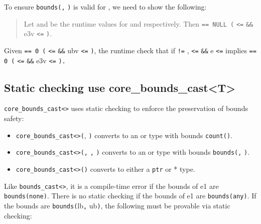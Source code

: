 To ensure \texttt{bounds(}\texttt{,} \texttt{)} is
valid for , we need to show the following:

\begin{quote}
Let  and  be the runtime values for  and
 respectively. Then  \texttt{== NULL
\textbar{}\textbar{} (} \texttt{\textless{}=} 
\texttt{\&\&} e3v \texttt{\textless{}=} \texttt{)}.
\end{quote}

Given  \texttt{== 0 \textbar{}\textbar{} (}
\texttt{\textless{}=}  \texttt{\&\&} ubv \texttt{\textless{}=}
\texttt{)}, the runtime check that if  \texttt{!=}
,  \texttt{\textless{}=}  \texttt{\&\&}
e \texttt{\textless{}=}  implies 
\texttt{== 0 \textbar{}\textbar{} (} \texttt{\textless{}=}
 \texttt{\&\&} e3v \texttt{\textless{}=}
\texttt{).}

\subsection{Static checking use core\_bounds\_cast\textless{}T\textgreater{}}

\texttt{core\_bounds\_cast\textless{}}\texttt{\textgreater{}}
uses static checking to enforce the preservation of bounds safety:

\begin{itemize}
\item
  \texttt{core\_bounds\_cast\textless{}}\texttt{\textgreater{}(},
  \texttt{)} converts  to an \arrayptr or
  \arrayview type with bounds
  \texttt{count(}\texttt{)}.
\item
  \texttt{core\_bounds\_cast\textless{}}\texttt{\textgreater{}(}\texttt{,}
  \texttt{,} \texttt{)} converts  to an
  \arrayptr or \arrayview type with bounds
  \texttt{bounds(}\texttt{,} \texttt{)}.
\item
  \texttt{core\_bounds\_cast\textless{}}\texttt{\textgreater{}(}\texttt{)}
  converts  to either a \texttt{ptr} or * type.
\end{itemize}

Like \texttt{bounds\_cast\textless{}}\texttt{\textgreater{}}, it
is a compile-time error if the bounds of e1 are \texttt{bounds(none)}.
There is no static checking if the bounds of e1 are
\texttt{bounds(any)}. If the bounds are \texttt{bounds(}lb\texttt{,}
ub\texttt{)}, the following must be provable via static checking:

